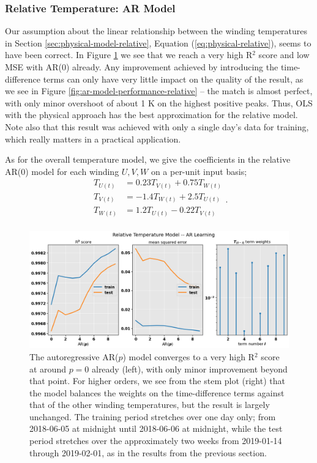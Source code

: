 \documentclass[]{article}
\begin{document}
\subsubsection{Relative Temperature: AR Model} \label{sec:results-relative-ar}
Our assumption about the linear relationship between the winding temperatures in Section \ref{sec:physical-model-relative}, Equation (\ref{eq:physical-relative}), seems to have been correct. In Figure \ref{fig:ar-model-learning-relative} we see that we reach a very high R$^2$ score and low MSE with AR($0$) already. Any improvement achieved by introducing the time-difference terms can only have very little impact on the quality of the result, as we see in Figure \ref{fig:ar-model-performance-relative} -- the match is almost perfect, with only minor overshoot of about 1 K on the highest positive peaks. Thus, OLS with the physical approach has the best approximation for the relative model. Note also that this result was achieved with only a single day's data for training, which really matters in a practical application.

As for the overall temperature model, we give the coefficients in the relative AR(0) model for each winding $U,V,W$ on a per-unit input basis;
\begin{equation}
\begin{aligned}
T_{U(t)} &= 0.23T_{V(t)} + 0.75T_{W(t)} \\
T_{V(t)} &= -1.4T_{W(t)} + 2.5T_{U(t)} \\
T_{W(t)} &= 1.2T_{U(t)} - 0.22T_{V(t)} \\
\end{aligned}.
\end{equation}

\begin{figure}[!h]
	\centering
	\includegraphics[width=1\linewidth]{./figs/ar-model-learning-relative.png}
	\caption{The autoregressive AR($p$) model converges to a very high R$^2$ score at around $p = 0$ already (left), with only minor improvement beyond that point. For higher orders, we see from the stem plot (right) that the model balances the weights on the time-difference terms against that of the other winding temperatures, but the result is largely unchanged. The training period stretches over one day only; from 2018-06-05 at midnight until 2018-06-06 at midnight, while the test period stretches over the approximately two weeks from 2019-01-14 through 2019-02-01, as in the results from the previous section.}
	\label{fig:ar-model-learning-relative}
\end{figure}
\end{document}
